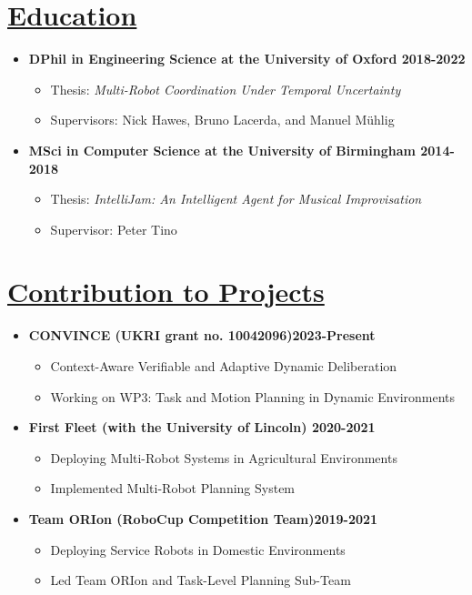 \documentclass[11pt]{article}
\begin{document}
\section*{\uline{Education\hfill}}
\vspace{-5pt}
\begin {itemize}
\item \textbf{DPhil in Engineering Science at the University of Oxford \hfill 2018-2022} 
\begin{itemize}
    \item Thesis: \emph{Multi-Robot Coordination Under Temporal Uncertainty}
    \item Supervisors: Nick Hawes, Bruno Lacerda, and Manuel M{\"u}hlig
\end{itemize}
			
\item \textbf{MSci in Computer Science at the University of Birmingham \hfill 2014-2018}
\begin{itemize}
\item Thesis: \emph{IntelliJam: An Intelligent Agent for Musical Improvisation}
\item Supervisor: Peter Tino
\end{itemize}
\end{itemize}

\vspace{-10pt}
\section*{\uline{Contribution to Projects\hfill}}
\vspace{-5pt}
\begin{itemize}
\item \textbf{CONVINCE (UKRI grant no. 10042096)\hfill 2023-Present}
\begin{itemize}
\item Context-Aware Verifiable and Adaptive Dynamic Deliberation 
\item Working on WP3: Task and Motion Planning in Dynamic Environments 
\end{itemize}
\item \textbf{First Fleet (with the University of Lincoln) \hfill 2020-2021}
\begin{itemize}
\item Deploying Multi-Robot Systems in Agricultural Environments
\item Implemented Multi-Robot Planning System
\end{itemize}
\item \textbf{Team ORIon (RoboCup Competition Team)\hfill 2019-2021}
\begin{itemize}
\item Deploying Service Robots in Domestic Environments
\item Led Team ORIon and Task-Level Planning Sub-Team
\end{itemize}
\end{itemize}
\end{document}
